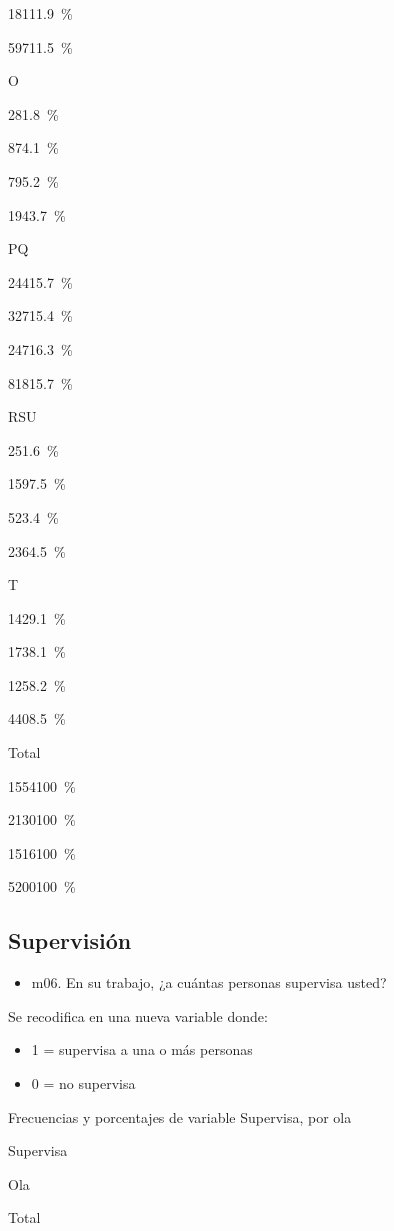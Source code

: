 \documentclass[
  12pt,
]{book}
\providecommand{\tightlist}{%
  \setlength{\itemsep}{0pt}\setlength{\parskip}{0pt}}
\begin{document}
{181}{11.9~\%}

{597}{11.5~\%}

O

{28}{1.8~\%}

{87}{4.1~\%}

{79}{5.2~\%}

{194}{3.7~\%}

PQ

{244}{15.7~\%}

{327}{15.4~\%}

{247}{16.3~\%}

{818}{15.7~\%}

RSU

{25}{1.6~\%}

{159}{7.5~\%}

{52}{3.4~\%}

{236}{4.5~\%}

T

{142}{9.1~\%}

{173}{8.1~\%}

{125}{8.2~\%}

{440}{8.5~\%}

Total

{1554}{100~\%}

{2130}{100~\%}

{1516}{100~\%}

{5200}{100~\%}

\hypertarget{supervisiuxf3n}{%
\subsection{Supervisión}\label{supervisiuxf3n}}

\begin{itemize}
\tightlist
\item
  m06. En su trabajo, ¿a cuántas personas supervisa usted?
\end{itemize}

Se recodifica en una nueva variable donde:

\begin{itemize}
\tightlist
\item
  1 = supervisa a una o más personas
\item
  0 = no supervisa
\end{itemize}

Frecuencias y porcentajes de variable Supervisa, por ola

Supervisa

Ola

Total
\end{document}
